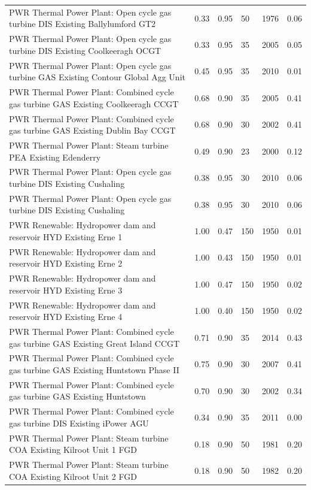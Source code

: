 \documentclass[gmd,manuscript]{copernicus}
\begin{document}
\begin{center}
\begin{longtable}{p{22em}lllll}
PWR Thermal Power Plant: Open cycle gas turbine DIS Existing Ballylumford GT2 & 0.33 & 0.95 & 50 & 1976 & 0.06 \\
PWR Thermal Power Plant: Open cycle gas turbine DIS Existing Coolkeeragh OCGT & 0.33 & 0.95 & 35 & 2005 & 0.05 \\
PWR Thermal Power Plant: Open cycle gas turbine GAS Existing Contour Global Agg Unit & 0.45 & 0.95 & 35 & 2010 & 0.01 \\
PWR Thermal Power Plant: Combined cycle gas turbine GAS Existing Coolkeeragh CCGT & 0.68 & 0.90 & 35 & 2005 & 0.41 \\
PWR Thermal Power Plant: Combined cycle gas turbine GAS Existing Dublin Bay CCGT & 0.68 & 0.90 & 30 & 2002 & 0.41 \\
PWR Thermal Power Plant: Steam turbine PEA Existing Edenderry & 0.49 & 0.90 & 23 & 2000 & 0.12 \\
PWR Thermal Power Plant: Open cycle gas turbine DIS Existing Cushaling & 0.38 & 0.95 & 30 & 2010 & 0.06 \\
PWR Thermal Power Plant: Open cycle gas turbine DIS Existing Cushaling & 0.38 & 0.95 & 30 & 2010 & 0.06 \\
PWR Renewable: Hydropower dam and reservoir HYD Existing Erne 1 & 1.00 & 0.47 & 150 & 1950 & 0.01 \\
PWR Renewable: Hydropower dam and reservoir HYD Existing Erne 2 & 1.00 & 0.43 & 150 & 1950 & 0.01 \\
PWR Renewable: Hydropower dam and reservoir HYD Existing Erne 3 & 1.00 & 0.47 & 150 & 1950 & 0.02 \\
PWR Renewable: Hydropower dam and reservoir HYD Existing Erne 4 & 1.00 & 0.40 & 150 & 1950 & 0.02 \\
PWR Thermal Power Plant: Combined cycle gas turbine GAS Existing Great Island CCGT & 0.71 & 0.90 & 35 & 2014 & 0.43 \\
PWR Thermal Power Plant: Combined cycle gas turbine GAS Existing Huntstown Phase II & 0.75 & 0.90 & 30 & 2007 & 0.41 \\
PWR Thermal Power Plant: Combined cycle gas turbine GAS Existing Huntstown & 0.70 & 0.90 & 30 & 2002 & 0.34 \\
PWR Thermal Power Plant: Combined cycle gas turbine DIS Existing iPower AGU & 0.34 & 0.90 & 35 & 2011 & 0.00 \\
PWR Thermal Power Plant: Steam turbine COA Existing Kilroot Unit 1 FGD & 0.18 & 0.90 & 50 & 1981 & 0.20 \\
PWR Thermal Power Plant: Steam turbine COA Existing Kilroot Unit 2 FGD & 0.18 & 0.90 & 50 & 1982 & 0.20 \\

\end{longtable}
\end{center}
\end{document}
